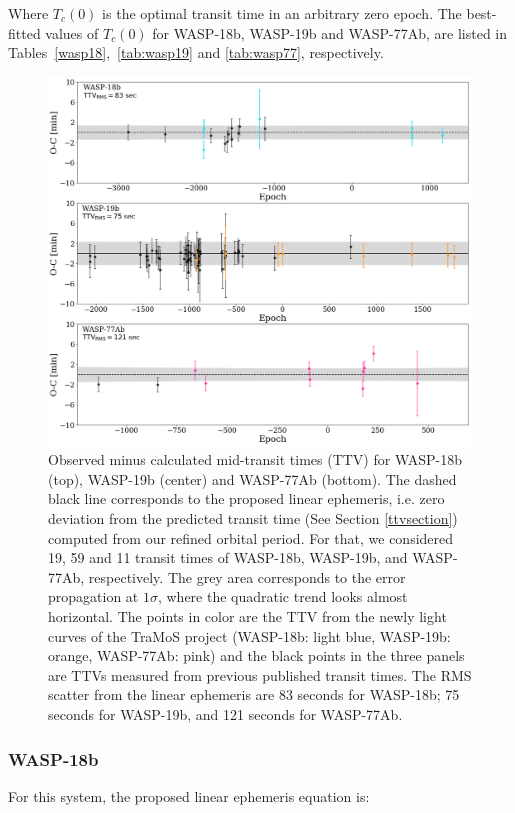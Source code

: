 Where $T_{c}(0)$ is the optimal transit time in an arbitrary zero epoch. The best-fitted values of $T_{c}(0)$ for WASP-18b, WASP-19b and WASP-77Ab, are listed in Tables~\ref{wasp18},~\ref{tab:wasp19} and \ref{tab:wasp77}, respectively.

\begin{figure}
\centering
\includegraphics[width=1.0\columnwidth]{imagenes/TTVs.png}
\caption{Observed minus calculated mid-transit times (TTV) for WASP-18b (top), WASP-19b (center) and WASP-77Ab (bottom). The dashed black line corresponds to the proposed linear ephemeris, i.e. zero deviation from the predicted transit time (See Section \ref{ttvsection}) computed from our refined orbital period. For that, we considered 19, 59 and 11 transit times of WASP-18b, WASP-19b, and WASP-77Ab, respectively. The grey area corresponds to the error propagation at $1\sigma$, where the quadratic trend looks almost horizontal. The points in color are the TTV from the newly light curves of the TraMoS project (WASP-18b: light blue, WASP-19b: orange, WASP-77Ab: pink) and the black points in the three panels are TTVs measured from previous published transit times. The RMS scatter from the linear ephemeris are 83 seconds for WASP-18b; 75 seconds for WASP-19b, and 121 seconds for WASP-77Ab.}
\label{all_ttv}
\end{figure}


\subsubsection{WASP-18b}
For this system, the proposed linear ephemeris equation is:


